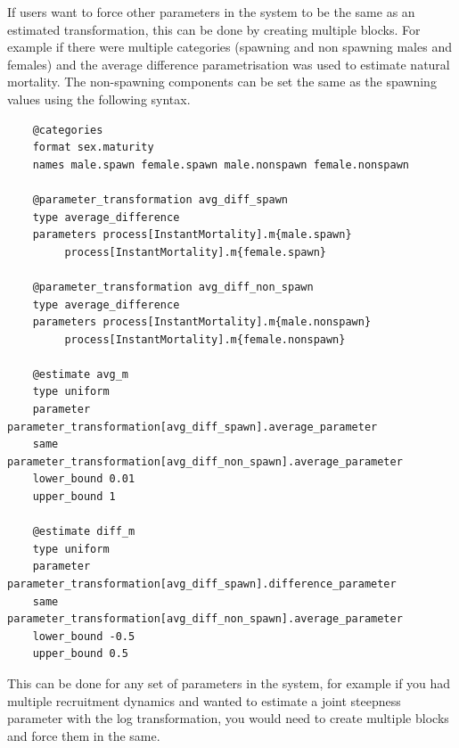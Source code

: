 If users want to force other parameters in the system to be the same as an estimated transformation, this can be done by creating multiple  blocks. For example if there were multiple categories (spawning and non spawning males and females) and the average difference parametrisation was used to estimate natural mortality. The non-spawning components can be set the same as the spawning values using the following syntax.

{\small{\begin{verbatim}
	@categories
	format sex.maturity
	names male.spawn female.spawn male.nonspawn female.nonspawn
	
	@parameter_transformation avg_diff_spawn
	type average_difference
	parameters process[InstantMortality].m{male.spawn} 
         process[InstantMortality].m{female.spawn}
	
	@parameter_transformation avg_diff_non_spawn
	type average_difference
	parameters process[InstantMortality].m{male.nonspawn} 
         process[InstantMortality].m{female.nonspawn}
	
	@estimate avg_m
	type uniform
	parameter parameter_transformation[avg_diff_spawn].average_parameter
	same parameter_transformation[avg_diff_non_spawn].average_parameter
	lower_bound 0.01
	upper_bound 1
	
	@estimate diff_m
	type uniform
	parameter parameter_transformation[avg_diff_spawn].difference_parameter
	same parameter_transformation[avg_diff_non_spawn].average_parameter
	lower_bound -0.5
	upper_bound 0.5		
\end{verbatim}}}

This can be done for any set of parameters in the system, for example if you had multiple recruitment dynamics and wanted to estimate a joint steepness parameter with the log transformation, you would need to create multiple blocks and force them in the same.
